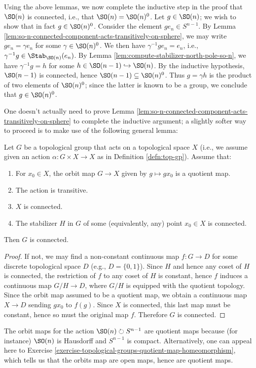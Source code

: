 \documentclass[reqno]{amsart} 
\begin{document}
Using the above lemmas,
we now complete the inductive step in the proof that $\SO(n)$ is
connected, i.e., that $\SO(n) = \SO(n)^0$.
Let $g \in \SO(n)$;
we wish to show that in fact $g \in \SO(n)^0$.
Consider the element $g e_n \in S^{n-1}$.
By Lemma
\ref{lem:so-n-connected-component-acts-transitively-on-sphere},
we may write $g e_n = \gamma e_n$ for some $\gamma \in
\SO(n)^0$.
We then have $\gamma^{-1} g e_n = e_n$,
i.e., $\gamma^{-1} g \in \Stab_{\SO(n)}(e_n)$.
By Lemma \ref{lem:compute-stabilizer-north-pole-so-n},
we have
$\gamma^{-1} g = h$ for some $h \in \SO(n-1) \hookrightarrow
\SO(n)$.
By the inductive hypothesis,
$\SO(n-1)$ is connected,
hence $\SO(n-1) \subseteq \SO(n)^0$.
Thus $g = \gamma h$ is the product
of two elements of $\SO(n)^0$;
since the latter is known to be a group,
we conclude that $g \in \SO(n)^0$.

\begin{remark}
  One doesn't actually need to prove Lemma
  \ref{lem:so-n-connected-component-acts-transitively-on-sphere}
  to complete the inductive argument;
  a slightly softer way to proceed
  is to make use of the following general lemma:
  \begin{lemma}
    Let $G$ be a topological group
    that acts on a topological space $X$
    (i.e., we assume given an action $\alpha : G \times X
    \rightarrow X$
    as in Definition \ref{defn:top-gp}).
    Assume that:
    \begin{enumerate}
    \item For $x_0 \in X$, the orbit map $G \rightarrow X$ given by $g \mapsto g x_0$ is a quotient map.
    \item The action is transitive.
    \item $X$ is connected.
    \item The stabilizer $H$ in $G$ of some (equivalently, any)
      point $x_0 \in X$
      is connected.
    \end{enumerate}
    Then $G$ is connected.
  \end{lemma}
  \begin{proof}
    If not, we may find a non-constant continuous map
    $f : G \rightarrow D$ for some discrete topological space $D$
    (e.g., $D = \{0,1\}$).  Since $H$ and hence any coset of $H$
    is connected, the restriction of $f$ to any coset of $H$ is
    constant,
    hence $f$ induces a continuous map
    $G/H \rightarrow D$,
    where $G/H$ is equipped with the quotient topology.
    Since the orbit map assumed to be a quotient map,
    we obtain a continuous map $X \rightarrow D$
    sending $g x_0$ to $f(g)$.
    Since $X$ is connected, this last map must be constant,
    hence so must the original map $f$.
    Therefore $G$ is connected.
  \end{proof}
  The orbit maps for the action $\SO(n) \circlearrowright S^{n-1}$
  are quotient maps
  because (for instance) $\SO(n)$ is Hausdorff and $S^{n-1}$ is
  compact.
  Alternatively, one can appeal here to Exercise \ref{exercise-topological-groups-quotient-map-homeomorphism},
  which tells us that the orbits map are open maps, hence are quotient maps.
\end{remark}
\end{document}
